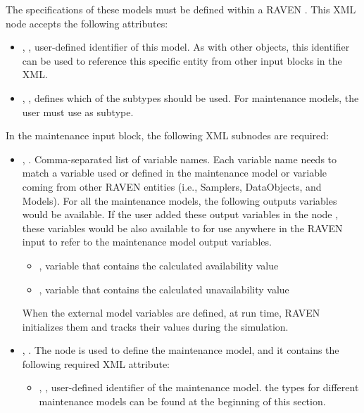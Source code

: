 The specifications of these models must be defined within a RAVEN . This
XML node accepts the following attributes:
\begin{itemize}
	\item {}, , user-defined identifier of this model.
	\nb As with other objects, this identifier can be used to reference this specific entity from other
	input blocks in the XML.
	\item {}, , defines which of the subtypes should
	be used. For maintenance models, the user must use  as subtype.
\end{itemize}
In the maintenance  input block, the following XML subnodes are required:
\begin{itemize}
	\item {}, . Comma-separated list of variable
	names. Each variable name needs to match a variable used or defined in the maintenance model or variable
	coming from other RAVEN entities (i.e., Samplers, DataObjects, and Models).
	\nb For all the maintenance models, the following outputs variables would be available. If the user
	added these output variables in the node , these variables would be also available to
	for use anywhere in the RAVEN input to refer to the maintenance model output variables.
	\begin{itemize}
		\item {}, variable that contains the calculated availability value
		\item {}, variable that contains the calculated unavailability value
	\end{itemize}
	\nb When the external model variables are defined, at run time, RAVEN initializes
	them and tracks their values during the simulation.
	\item {}, . The node is used to define the maintenance
	model, and it contains the following required XML attribute:
	\begin{itemize}
		\item {}, , user-defined identifier of the maintenance model.
		\nb the types for different maintenance models can be found at the beginning of this section.
	\end{itemize}
\end{itemize}
